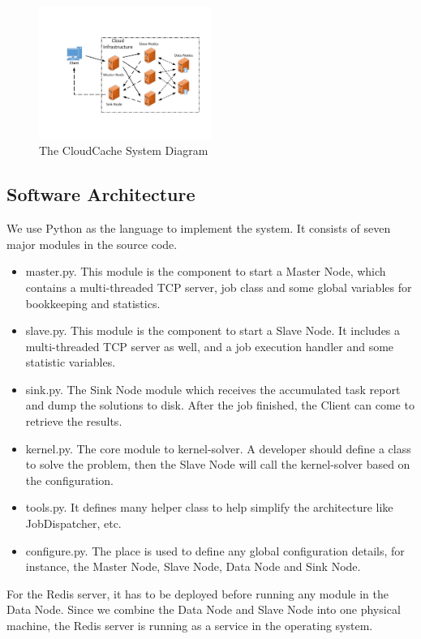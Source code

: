 \begin{figure}
\centering
\includegraphics[width=0.5\textwidth]{pics/cloud-cache-arch.pdf}
\caption{The CloudCache System Diagram}
\label{fig:system}
\end{figure}

\subsection{Software Architecture}
We use Python as the language to implement the system. It consists of seven major modules in the source code.

\begin{itemize}
\item master.py. This module is the component to start a Master Node, which contains a multi-threaded TCP server, job class and some global variables for bookkeeping and statistics.

\item slave.py. This module is the component to start a Slave Node. It includes a multi-threaded TCP server as well, and a job execution handler and some statistic variables.
\item sink.py. The Sink Node module which receives the accumulated task report and dump the solutions to disk. After the job finished, the Client can come to retrieve the results.
\item kernel.py. The core module to kernel-solver. A developer should define a class to solve the problem, then the Slave Node will call the kernel-solver based on the configuration.
\item tools.py. It defines many helper class to help simplify the architecture like JobDispatcher, etc.
\item configure.py. The place is used to define any global configuration details, for instance, the Master Node, Slave Node, Data Node and Sink Node.
\end{itemize}

For the Redis server, it has to be deployed before running any module in the Data Node. Since we combine the Data Node and Slave Node into one physical machine, the Redis server is running as a service in the operating system.


